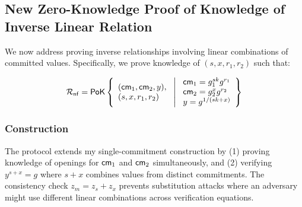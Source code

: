 \subsection{New Zero-Knowledge Proof of Knowledge of Inverse Linear Relation}\label{sec-pok-committed-inv-linear-relation}

We now address proving inverse relationships involving linear combinations of committed values. Specifically, we prove knowledge of $(s, x, r_1, r_2)$ such that:

\[
\mathcal{R}_{\mathsf{nf}} =  {\mathsf{PoK}} \left\{ 
\begin{array}{l} (\mathsf{cm}_1, \mathsf{cm}_2, y),\\
(s, x, r_1, r_2) 
\end{array}
\ \middle|
\ \begin{array}{l}
\mathsf{cm}_1 = g_1^{sk} g^{r_1} \\
\mathsf{cm}_2 = g_2^{x} g^{r_2} \\
y = g^{1/(sk + x)} \\
\end{array} \right\}
\]






\subsubsection{Construction}
The protocol extends my single-commitment construction by (1) proving knowledge of openings for $\mathsf{cm}_1$ and $\mathsf{cm}_2$ simultaneously, and (2) verifying $y^{s+x} = g$ where $s+x$ combines values from distinct commitments. The consistency check $z_m = z_{s} + z_x$ prevents substitution attacks where an adversary might use different linear combinations across verification equations.

